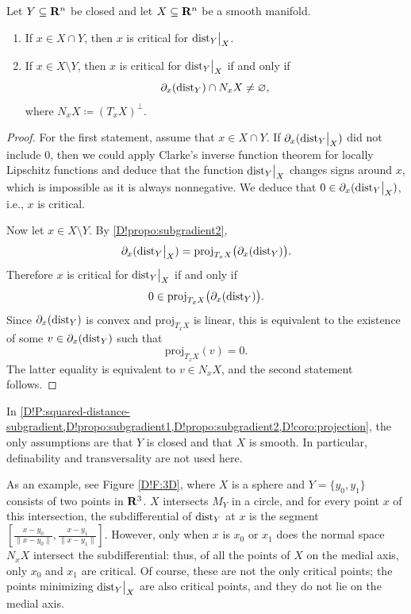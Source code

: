 \begin{corollary}
\label{D!coro:projection}
  Let $Y \subseteq \mathbf{R}^n$ be closed and let $X \subseteq \mathbf{R}^n$ be a smooth manifold.
  \begin{enumerate}
    \item If $x \in X \cap Y$, then $x$ is critical for $\mathord{\operatorname{dist}}_Y\big|_X$.
    \item If $x \in X \setminus Y$, then $x$ is critical for $\mathord{\operatorname{dist}}_Y\big|_X$ if and only if
    \[
      \partial_x(\operatorname{dist}_Y)\cap N_xX \neq \varnothing,
    \]
    where $N_xX \coloneq (T_xX)^\perp$.
  \end{enumerate}
\end{corollary}

\begin{proof}
  For the first statement, assume that $x \in X \cap Y$.
  If $\partial_x(\mathord{\operatorname{dist}}_Y\big|_X)$ did not include $0$, then we could apply Clarke's inverse function theorem for locally Lipschitz functions \cite[Theorem 1]{clarkeIFT} and deduce that the function $\mathord{\operatorname{dist}}_Y\big|_X$ changes signs around $x$, which is impossible as it is always nonnegative. We deduce that $0 \in \partial_x(\mathord{\operatorname{dist}}_Y\big|_X)$, i.e., $x$ is critical.

  Now let $x \in X \setminus Y$. By \cref{D!propo:subgradient2},
  \[
    \partial_x(\mathord{\operatorname{dist}}_Y\big|_X)=\mathrm{proj}_{T_xX}\bigl(\partial_x(\operatorname{dist}_Y)\bigr).
  \]
  Therefore $x$ is critical for $\mathord{\operatorname{dist}}_Y\big|_X$ if and only if
  \[
    0 \in \mathrm{proj}_{T_xX}\bigl(\partial_x(\operatorname{dist}_Y)\bigr).
  \]
  Since $\partial_x(\operatorname{dist}_Y)$ is convex and $\mathrm{proj}_{T_xX}$ is linear, this is equivalent to the existence of some $v \in \partial_x(\operatorname{dist}_Y)$ such that
  \[
    \mathrm{proj}_{T_xX}(v)=0.
  \]
  The latter equality is equivalent to $v \in N_xX$, and the second statement follows.
\end{proof}

\begin{remark}
  In \cref{D!P:squared-distance-subgradient,D!propo:subgradient1,D!propo:subgradient2,D!coro:projection}, the only assumptions are that $Y$ is closed and that $X$ is smooth. In particular, definability and transversality are not used here.
\end{remark}

\begin{example}
  As an example, see Figure \ref{D!F:3D}, where $X$ is a sphere and $Y = \{y_0, y_1\}$ consists of two points in $\mathbf{R}^3$. $X$ intersects $M_Y$ in a circle, and for every point $x$ of this intersection, the subdifferential of $\operatorname{dist}_Y$ at $x$ is the segment $[\frac{x - y_0}{\|x - y_0\|}, \frac{x - y_1}{\|x - y_1\|}]$. However, only when $x$ is $x_0$ or $x_1$ does the normal space $N_x X$ intersect the subdifferential: thus, of all the points of $X$ on the medial axis, only $x_0$ and $x_1$ are critical. Of course, these are not the only critical points; the points minimizing $\mathord{\operatorname{dist}}_Y\big|_X$ are also critical points, and they do not lie on the medial axis.
\end{example}

